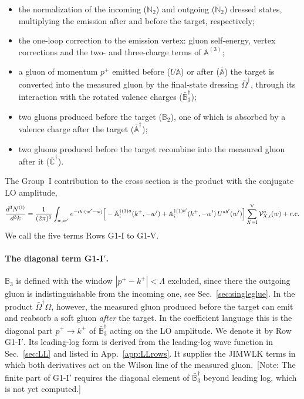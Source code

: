 \documentclass[aps,prd,onecolumn,superscriptaddress,nofootinbib,floatfix,longbibliography,11pt]{revtex4-2}
\numberwithin{equation}{section}
\newif\ifshownotes \shownotestrue
\newcommand{\note}[1]{\ifshownotes{\color{red}\,[\textsf{Note:} #1]}\fi}
\def\mf#1{\mathbb{#1}}
\begin{document}
\begin{itemize}
\item[I:] the normalization of the incoming ($\mf N_2$) and outgoing ($\bar{\mf N}_2$) dressed states, multiplying the emission after and before the target, respectively;
\item[II:] the one-loop correction to the emission vertex: gluon self-energy, vertex corrections and the two- and three-charge terms of $\mf A^{(3)}$;
\item[III:] a gluon of momentum $p^+$ emitted before ($U\mf A$) or after ($\bar{\mf A}$) the target is converted into the measured gluon by the final-state dressing $\bar\Omega^\dagger$, through its interaction with the rotated valence charges ($\bar{\mf B}_3^\dagger$);
\item[IV:] two gluons produced before the target ($\mf B_2$), one of which is absorbed by a valence charge after the target ($\bar{\mf A}^\dagger$);
\item[V:] two gluons produced before the target recombine into the measured gluon after it ($\bar{\mf C}^\dagger$).
\end{itemize}
The Group~I contribution to the cross section is the product with the conjugate LO amplitude,
\begin{equation}
\frac{d^3N^{\rm (I)}}{d^3k}=\frac{1}{(2\pi)^3}\int_{w,w'}e^{-ik\cdot(w'-w)}\Big[-\bar{\mf A}^{\dagger(1)a}_i(k^+,-w')+\mf A^{\dagger(1)b'}_i(k^+,-w')\,U^{ab'}(w')\Big]\sum_{X={\rm I}}^{\rm V}\mathcal V^a_{X,i}(w)+{\rm c.c.}
\label{eq:CS1}
\end{equation}
We call the five terms Rows G1-I to G1-V.

\paragraph*{The diagonal term G1-I$'$.} $\mf B_3$ is defined with the window $|p^+-k^+|<\Lambda$ excluded, since there the outgoing gluon is indistinguishable from the incoming one, see Sec.~\ref{sec:singleglue}. In the product $\bar\Omega^\dagger\Omega$, however, the measured gluon produced before the target can emit and reabsorb a soft gluon \emph{after} the target. In the coefficient language this is the diagonal part $p^+\to k^+$ of $\bar{\mf B}^\dagger_3$ acting on the LO amplitude. We denote it by Row G1-I$'$. Its leading-log form is derived from the leading-log wave function in Sec.~\ref{sec:LL} and listed in App.~\ref{app:LLrows}. It supplies the JIMWLK terms in which both derivatives act on the Wilson line of the measured gluon.
\note{The finite part of G1-I$'$ requires the diagonal element of $\bar{\mf B}_3^\dagger$ beyond leading log, which is not yet computed.}
\end{document}
